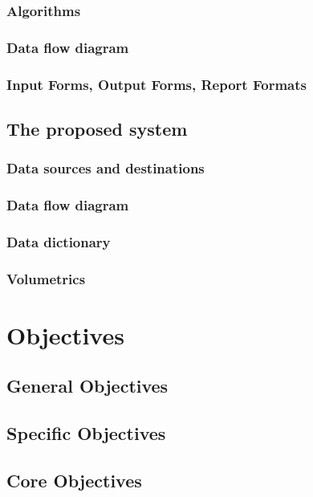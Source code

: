 \subsubsection{Algorithms}

\subsubsection{Data flow diagram}

\subsubsection{Input Forms, Output Forms, Report Formats}

\subsection{The proposed system}

\subsubsection{Data sources and destinations}

\subsubsection{Data flow diagram}

\subsubsection{Data dictionary}

\subsubsection{Volumetrics}

\section{Objectives}

\subsection{General Objectives}

\subsection{Specific Objectives}

\subsection{Core Objectives}

